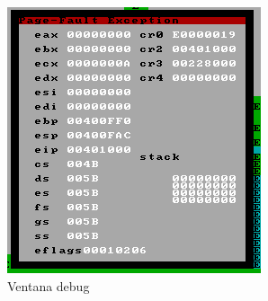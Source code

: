 \begin{enumerate}
\begin{figure}
  \centering
    \includegraphics{imagenes/debug.png}
  \caption{Ventana debug}
  \label{fig:ejemplo}
\end{figure}
 \FloatBarrier
 

\end{enumerate}
